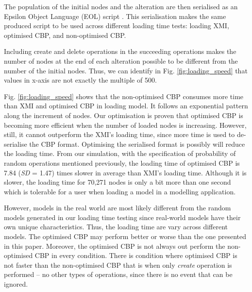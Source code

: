 \documentclass{llncs}
\begin{document}
{The population of the initial nodes and the alteration are then serialised as an Epsilon Object Language (EOL) script \cite{kolovos2006epsilon}. This serialisation makes the same produced script to be used across different loading time tests: loading XMI, optimised CBP, and non-optimised CBP. 

Including create and delete operations in the succeeding operations makes the number of nodes at the end of each alteration possible to be different from the number of the initial nodes. Thus, we can identify in Fig. \ref{fig:loading_speed} that values in x-axis are not exactly the multiple of 500.    

Fig. \ref{fig:loading_speed} shows that the non-optimised CBP consumes more time than XMI and optimised CBP in loading model. It follows an exponential pattern along the increment of nodes. Our optimisation is proven that optimised CBP is becoming more efficient when the number of loaded nodes is increasing. However, still, it cannot outperform the XMI's loading time, since more time is used to de-serialise the CBP format. Optimising the serialised format is possibly will reduce the loading time. From our simulation, with the specification of probability of random operations mentioned previously, the loading time of optimised CBP is 7.84 (\textit{SD} = 1.47) times slower in average than XMI's loading time. Although it is slower, the loading time for 70,271 nodes is only a bit more than one second which is tolerable for a user when loading a model in a modelling application. 

However, models in the real world are most likely different from the random models generated in our loading time testing since real-world models have their own unique characteristics. Thus, the loading time are vary across different models. The optimised CBP may perform better or worse than the one presented in this paper. Moreover, the optimised CBP is not always out perform the non-optimised CBP in every condition. There is condition where optimised CBP is not faster than the non-optimised CBP that is when only \emph{create} operation is performed -- no other types of operations, since there is no event that can be ignored. 

}
\end{document}
